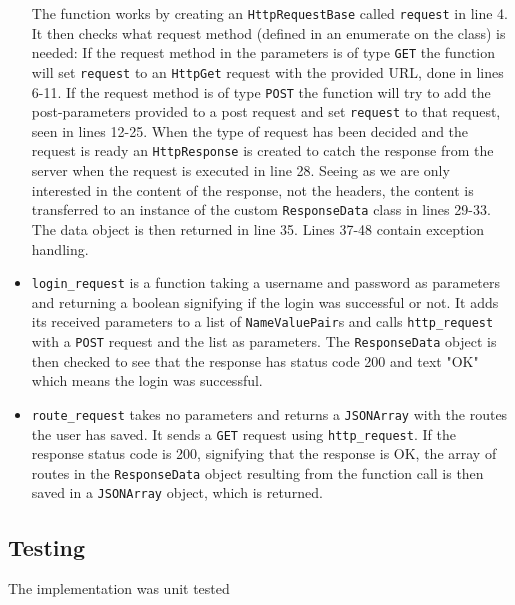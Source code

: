 \begin{itemize}
The function works by creating an \texttt{HttpRequestBase} called \texttt{request} in line 4. It then checks what request method (defined in an enumerate on the class) is needed: If the request method in the parameters is of type \texttt{GET} the function will set \texttt{request} to an \texttt{HttpGet} request with the provided URL, done in lines 6-11. If the request method is of type \texttt{POST} the function will try to add the post-parameters provided to a post request and set \texttt{request} to that request, seen in lines 12-25. When the type of request has been decided and the request is ready an \texttt{HttpResponse} is created to catch the response from the server when the request is executed in line 28. Seeing as we are only interested in the content of the response, not the headers, the content is transferred to an instance of the custom \texttt{ResponseData} class in lines 29-33. The data object is then returned in line 35. Lines 37-48 contain exception handling.
 
\item \texttt{login\_request} is a function taking a username and password as parameters and returning a boolean signifying if the login was successful or not. It adds its received parameters to a list of \texttt{NameValuePair}s and calls \texttt{http\_request} with a \texttt{POST} request and the list as parameters. The \texttt{ResponseData} object is then checked to see that the response has status code 200 and text "OK" which means the login was successful.

\item \texttt{route\_request} takes no parameters and returns a \texttt{JSONArray} with the routes the user has saved. It sends a \texttt{GET} request using \texttt{http\_request}. If the response status code is 200, signifying that the response is OK, the array of routes in the \texttt{ResponseData} object resulting from the function call is then saved in a \texttt{JSONArray} object, which is returned. 
\end{itemize}

\subsection{Testing}
The implementation was unit tested